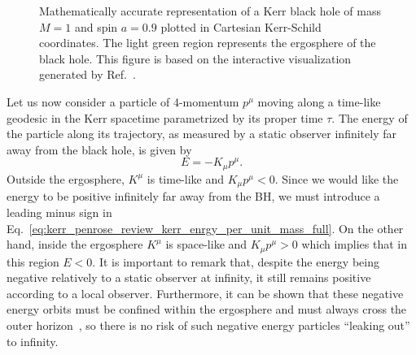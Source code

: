 \begin{figure}[!ht]
  \centering
  
  \caption{Mathematically accurate representation of a Kerr black hole of mass $M=1$ and spin $a=0.9$ plotted in Cartesian Kerr-Schild coordinates. The light green region represents the ergosphere of the black hole. This figure is based on the interactive visualization generated by Ref.~\cite{KerrSurfaceViz}.}
  \label{fig:kerr_penrose_review_kerr_surfaces}
\end{figure}

Let us now consider a particle of 4-momentum $p^\mu$ moving along a time-like geodesic in the Kerr spacetime parametrized by its proper time $\tau$. The energy of the particle along its trajectory, as measured by a static observer infinitely far away from the black hole, is given by
%
\begin{equation}
  E = -K_\mu p^\mu.
  \label{eq:kerr_penrose_review_kerr_enrgy_per_unit_mass_full}
\end{equation}
%
Outside the ergosphere, $K^\mu$ is time-like and $K_\mu p^\mu<0$. Since we would like the energy to be positive infinitely far away from the BH, we must introduce a leading minus sign in Eq.~\eqref{eq:kerr_penrose_review_kerr_enrgy_per_unit_mass_full}. On the other hand, inside the ergosphere $K^\mu$ is space-like and $K_\mu p^\mu >0$ which implies that in this region $E < 0$. It is important to remark that, despite the energy being negative relatively to a static observer at infinity, it still remains positive according to a local observer. Furthermore, it can be shown that these negative energy orbits must be confined within the ergosphere and must always cross the outer horizon~\cite{Grib:2013hxa,Contopoulos1984}, so there is no risk of such negative energy particles ``leaking out'' to infinity.

